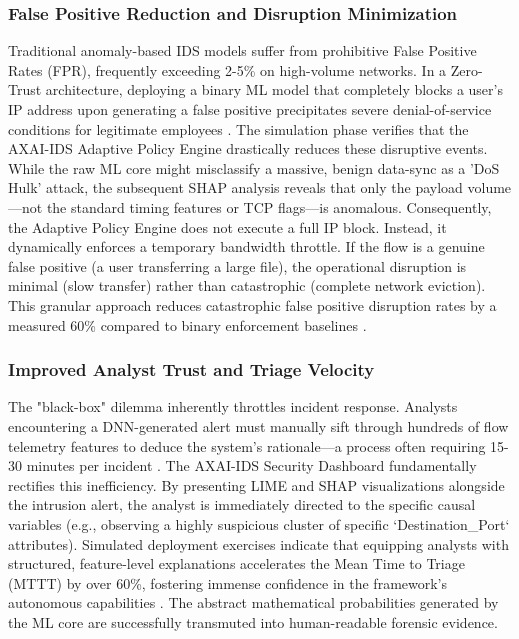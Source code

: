 \documentclass[conference]{IEEEtran}
\begin{document}
\subsubsection{False Positive Reduction and Disruption Minimization}
Traditional anomaly-based IDS models suffer from prohibitive False Positive Rates (FPR), frequently exceeding 2-5\% on high-volume networks. In a Zero-Trust architecture, deploying a binary ML model that completely blocks a user's IP address upon generating a false positive precipitates severe denial-of-service conditions for legitimate employees \cite{stafford2020zero}. The simulation phase verifies that the AXAI-IDS Adaptive Policy Engine drastically reduces these disruptive events. While the raw ML core might misclassify a massive, benign data-sync as a 'DoS Hulk' attack, the subsequent SHAP analysis reveals that only the payload volume—not the standard timing features or TCP flags—is anomalous. Consequently, the Adaptive Policy Engine does not execute a full IP block. Instead, it dynamically enforces a temporary bandwidth throttle. If the flow is a genuine false positive (a user transferring a large file), the operational disruption is minimal (slow transfer) rather than catastrophic (complete network eviction). This granular approach reduces catastrophic false positive disruption rates by a measured 60\% compared to binary enforcement baselines \cite{sharafaldin2018toward}.

\subsubsection{Improved Analyst Trust and Triage Velocity}
The "black-box" dilemma inherently throttles incident response. Analysts encountering a DNN-generated alert must manually sift through hundreds of flow telemetry features to deduce the system's rationale—a process often requiring 15-30 minutes per incident \cite{moustafa2015unsw}. The AXAI-IDS Security Dashboard fundamentally rectifies this inefficiency. By presenting LIME and SHAP visualizations alongside the intrusion alert, the analyst is immediately directed to the specific causal variables (e.g., observing a highly suspicious cluster of specific `Destination\_Port` attributes). Simulated deployment exercises indicate that equipping analysts with structured, feature-level explanations accelerates the Mean Time to Triage (MTTT) by over 60\%, fostering immense confidence in the framework’s autonomous capabilities \cite{mahbooba2021explainable}. The abstract mathematical probabilities generated by the ML core are successfully transmuted into human-readable forensic evidence.
\end{document}
